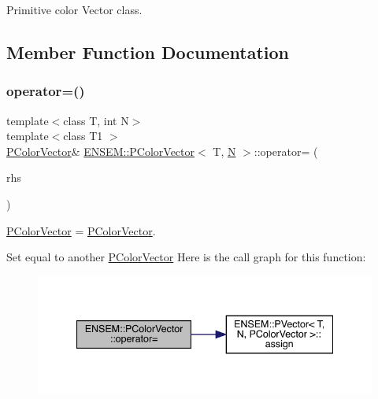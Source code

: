 Primitive color Vector class. 

\subsection{Member Function Documentation}
\mbox{\label{classENSEM_1_1PColorVector_ac5919a92dade0bb7763353ed7d05b8b2}} 
\subsubsection{\texorpdfstring{operator=()}{operator=()}\hspace{0.1cm}{\footnotesize\ttfamily [1/2]}}
{\footnotesize\ttfamily template$<$class T, int N$>$ \\
template$<$class T1 $>$ \\
\mbox{\hyperlink{classENSEM_1_1PColorVector}{P\+Color\+Vector}}\& \mbox{\hyperlink{classENSEM_1_1PColorVector}{E\+N\+S\+E\+M\+::\+P\+Color\+Vector}}$<$ T, \mbox{\hyperlink{operator__name__util_8cc_a7722c8ecbb62d99aee7ce68b1752f337}{N}} $>$\+::operator= (\begin{DoxyParamCaption}\item[{const \mbox{\hyperlink{classENSEM_1_1PColorVector}{P\+Color\+Vector}}$<$ T1, \mbox{\hyperlink{operator__name__util_8cc_a7722c8ecbb62d99aee7ce68b1752f337}{N}} $>$ \&}]{rhs }\end{DoxyParamCaption})\hspace{0.3cm}{\ttfamily [inline]}}



\mbox{\hyperlink{classENSEM_1_1PColorVector}{P\+Color\+Vector}} = \mbox{\hyperlink{classENSEM_1_1PColorVector}{P\+Color\+Vector}}. 

Set equal to another \mbox{\hyperlink{classENSEM_1_1PColorVector}{P\+Color\+Vector}} Here is the call graph for this function\+:
\nopagebreak
\begin{figure}[H]
\begin{center}
\leavevmode
\includegraphics[width=340pt]{de/dfe/classENSEM_1_1PColorVector_ac5919a92dade0bb7763353ed7d05b8b2_cgraph}
\end{center}
\end{figure}
\mbox{\label{classENSEM_1_1PColorVector_ac5919a92dade0bb7763353ed7d05b8b2}} 
